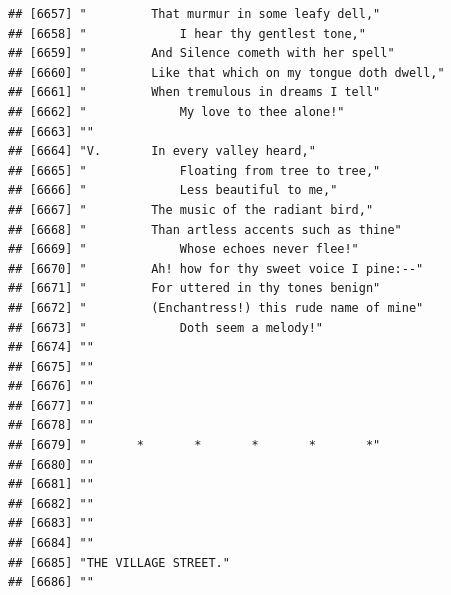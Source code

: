 \documentclass{article}\usepackage[]{graphicx}\usepackage[]{color}
\makeatletter
\newenvironment{kframe}{%
 \def\at@end@of@kframe{}%
 \ifinner\ifhmode%
  \def\at@end@of@kframe{\end{minipage}}%
  \begin{minipage}{\columnwidth}%
 \fi\fi%
 \def\FrameCommand##1{\hskip\@totalleftmargin \hskip-\fboxsep
 \colorbox{shadecolor}{##1}\hskip-\fboxsep
     \hskip-\linewidth \hskip-\@totalleftmargin \hskip\columnwidth}%
 \MakeFramed {\advance\hsize-\width
   \@totalleftmargin\z@ \linewidth\hsize
   \@setminipage}}%
 {\par\unskip\endMakeFramed%
 \at@end@of@kframe}
\newenvironment{knitrout}{}{} %
\makeatother
\begin{document}
\begin{knitrout}
\begin{kframe}
\begin{verbatim}
## [6657] "         That murmur in some leafy dell,"                                    
## [6658] "             I hear thy gentlest tone,"                                      
## [6659] "         And Silence cometh with her spell"                                  
## [6660] "         Like that which on my tongue doth dwell,"                           
## [6661] "         When tremulous in dreams I tell"                                    
## [6662] "             My love to thee alone!"                                         
## [6663] ""                                                                            
## [6664] "V.       In every valley heard,"                                             
## [6665] "             Floating from tree to tree,"                                    
## [6666] "             Less beautiful to me,"                                          
## [6667] "         The music of the radiant bird,"                                     
## [6668] "         Than artless accents such as thine"                                 
## [6669] "             Whose echoes never flee!"                                       
## [6670] "         Ah! how for thy sweet voice I pine:--"                              
## [6671] "         For uttered in thy tones benign"                                    
## [6672] "         (Enchantress!) this rude name of mine"                              
## [6673] "             Doth seem a melody!"                                            
## [6674] ""                                                                            
## [6675] ""                                                                            
## [6676] ""                                                                            
## [6677] ""                                                                            
## [6678] ""                                                                            
## [6679] "       *       *       *       *       *"                                    
## [6680] ""                                                                            
## [6681] ""                                                                            
## [6682] ""                                                                            
## [6683] ""                                                                            
## [6684] ""                                                                            
## [6685] "THE VILLAGE STREET."                                                         
## [6686] ""                                                                            

\end{verbatim}
\end{kframe}
\end{knitrout}
\end{document}
